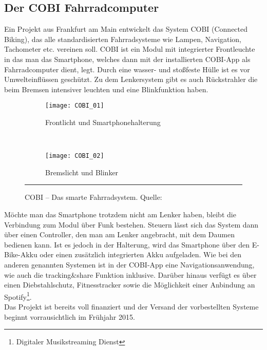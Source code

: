 \subsection{Der COBI Fahrradcomputer}
Ein Projekt aus Frankfurt am Main entwickelt das System \textsc{COBI} (Connected Biking), das alle standardisierten Fahrradsysteme wie Lampen, Navigation, Tachometer etc. vereinen soll. \textsc{COBI} ist ein Modul mit integrierter Frontleuchte in das man das \gls{Smartphone}, welches dann mit der installierten \textsc{COBI}-\Gls{App} als Fahrradcomputer dient, legt. Durch eine wasser- und stoßfeste Hülle ist es vor Umwelteinflüssen geschützt. Zu dem Lenkersystem gibt es auch Rückstrahler die beim Bremsen intensiver leuchten und eine Blinkfunktion haben.
\begin{figure}[H]
        \centering
        \begin{subfigure}[b]{0.49\textwidth}
                \texttt{[image: COBI\_01]}
                \caption{Frontlicht und Smartphonehalterung}
                \label{fig:cobi1}
        \end{subfigure}%
        ~ %
        \begin{subfigure}[b]{0.49\textwidth}
                \texttt{[image: COBI\_02]}
                \caption{Bremslicht und Blinker}
                \label{fig:cobi2}
        \end{subfigure}
        \rule{35em}{0.5pt}
        \caption[COBI]{COBI -- Das smarte Fahrradsystem. Quelle: \cite{cobi_pic}}
        \label{fig:cobi}
\end{figure}
Möchte man das \gls{Smartphone} trotzdem nicht am Lenker haben, bleibt die Verbindung zum Modul über Funk bestehen. Steuern lässt sich das System dann über einen Controller, den man am Lenker angebracht, mit dem Daumen bedienen kann. Ist es jedoch in der Halterung, wird das \gls{Smartphone} über den E-Bike-Akku oder einen zusätzlich integrierten Akku aufgeladen. Wie bei den anderen genannten Systemen ist in der \textsc{COBI}-\Gls{App} eine Navigationsanwendung, wie auch die tracking\&share Funktion inklusive. Darüber hinaus verfügt es über einen Diebstahlschutz, Fitnesstracker sowie die Möglichkeit einer Anbindung an Spotify\footnote{ Digitaler Musikstreaming Dienst}.\\
Das Projekt ist bereits voll finanziert und der Versand der vorbestellten Systeme beginnt vorrausichtlich im Frühjahr 2015\cite{cobi}.
